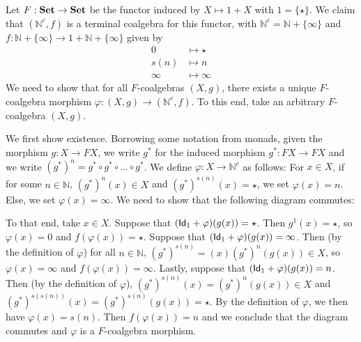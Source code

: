 \begin{solution} \label{sol:conatural_numbers_terminal_coalgebra}
	Let $ F: \SET \to \SET $ be the functor induced by $ X \mapsto 1 + X $ with $ 1 = \{ \star \} $.
	We claim that $ (\mathbb N^c, f) $ is a terminal coalgebra for this functor, with $ \mathbb N^c = \mathbb N + \{ \infty \} $ and $ f: \mathbb N + \{ \infty \} \to 1 + \mathbb N + \{ \infty \} $ given by
	\begin{align*}
		0 &\mapsto \star\\
		s(n) &\mapsto n\\
		\infty &\mapsto \infty
	\end{align*}
	We need to show that for all $ F $-coalgebras $ (X, g) $, there exists a unique $ F $-coalgebra morphism $ \varphi: (X, g) \to (\mathbb N^c , f) $. To this end, take an arbitrary $ F $-coalgebra $ (X, g) $.

	We first show existence. Borrowing some notation from monads, given the morphism $ g: X \to F X $, we write $ g^* $ for the induced morphism $ g^*: F X \to F X $ and we write $ (g^*)^n = g^* \circ g^* \circ \dots \circ g^* $. We define $ \varphi: X \to \mathbb N^c $ as follows: For $ x \in X $, if for some $ n \in \mathbb N $, $ (g^*)^n(x) \in X $ and $ (g^*)^{s(n)}(x) = \star $, we set $ \varphi(x) = n $. Else, we set $ \varphi(x) = \infty $. We need to show that the following diagram commutes:
	\begin{center}
	\end{center}
	To that end, take $ x \in X $. Suppose that $ (\Id[1] + \varphi)(g(x)) = \star $. Then $ g^1(x) = \star $, so $ \varphi(x) = 0 $ and $ f(\varphi(x)) = \star $. Suppose that $ (\Id[1] + \varphi)(g(x)) = \infty $. Then (by the definition of $ \varphi $) for all $ n \in \mathbb N $, $ (g^*)^{s(n)} = (x)(g^*)^n(g(x)) \in X $, so $ \varphi(x) = \infty $ and $ f(\varphi(x)) = \infty $. Lastly, suppose that $ (\Id[1] + \varphi)(g(x)) = n $. Then (by the definition of $ \varphi $), $ (g^*)^{s(n)}(x) = (g^*)^{n}(g(x)) \in X $ and $ (g^*)^{s(s(n))}(x) = (g^*)^{s(n)}(g(x)) = \star $. By the definition of $ \varphi $, we then have $ \varphi(x) = s(n) $. Then $ f(\varphi(x)) = n $ and we conclude that the diagram commutes and $ \varphi $ is a $ F $-coalgebra morphism.


\end{solution}
